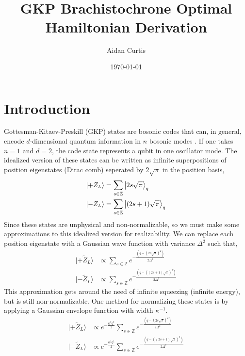 \documentclass[11pt]{article}
\title{GKP Brachistochrone Optimal Hamiltonian Derivation}
\author{Aidan Curtis}
\date{\today}
\begin{document}
\maketitle

\section{Introduction}

Gottesman-Kitaev-Preskill (GKP) states are bosonic codes that can, in general, encode $d$-dimensional quantum information in $n$ bosonic modes \cite{gottesman2001Encoding}. If one takes $n = 1$ and $d = 2$, the code state represents a qubit in one oscillator mode. The idealized version of these states can be written as infinite superpositions of position eigenstates (Dirac comb) seperated by $2\sqrt{\pi}$ in the position basis,
\begin{align}
    \ket{+Z_L} & = \sum_{s \in \mathbb{Z}} \ket{2s\sqrt{\pi}}_q       \\
    \ket{-Z_L} & = \sum_{s \in \mathbb{Z}} \ket{(2s + 1)\sqrt{\pi}}_q
\end{align}
Since these states are unphysical and non-normalizable, so we must make some approximations to this idealized version for realizability. We can replace each position eigenstate with a Gaussian wave function with variance $\Delta^2$ such that,
\begin{align}
    | +\tilde{Z}_L \rangle & \propto \sum_{s \in \mathbb{Z}} e^{-\frac{(q - (2s\sqrt{\pi})^2)}{2 \Delta^2}}       \\
    | -\tilde{Z}_L \rangle & \propto \sum_{s \in \mathbb{Z}} e^{-\frac{(q - ((2s + 1)\sqrt{\pi})^2)}{2 \Delta^2}}
\end{align}
This approximation gets around the need of infinite squeezing (infinite energy), but is still non-normalizable. One method for normalizing these states is by applying a Gaussian envelope function with width $\kappa^{-1}$.
\begin{align}
    | +\tilde{Z}_L \rangle & \propto e^{-\frac{\kappa^2 q^2}{2}} \sum_{s \in \mathbb{Z}} e^{-\frac{(q - (2s\sqrt{\pi})^2)}{2 \Delta^2}}       \\
    | -\tilde{Z}_L \rangle & \propto e^{-\frac{\kappa^2 q^2}{2}} \sum_{s \in \mathbb{Z}} e^{-\frac{(q - ((2s + 1)\sqrt{\pi})^2)}{2 \Delta^2}}
\end{align}
\end{document}
